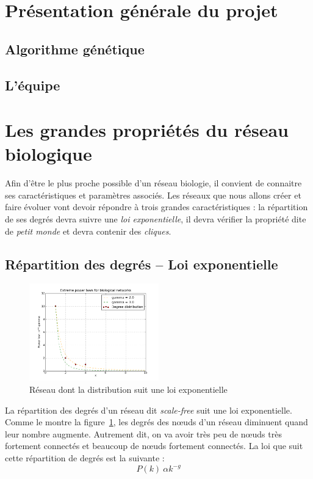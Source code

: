 


\maketitle


\section{Présentation générale du projet}

\subsection{Algorithme génétique}

\subsection{L'équipe}


\section{Les grandes propriétés du réseau biologique}
Afin d'être le plus proche possible d'un réseau biologie, il convient de connaitre ses caractéristiques et paramètres associés. Les réseaux que nous allons créer et faire évoluer vont devoir répondre à trois grandes caractéristiques : la répartition de ses degrés devra suivre une \textit{loi exponentielle}, il devra vérifier la propriété dite de \textit{\og petit monde \fg} et devra contenir des \textit{cliques}.

\subsection{Répartition des degrés -- Loi exponentielle}
\begin{figure}
  \vspace{-30pt}
  \begin{center}
    \includegraphics[width=0.50\textwidth]{plot.png}
  \end{center}
  \caption{Réseau dont la distribution suit une loi exponentielle}
  \label{scalefree}
\end{figure}
La répartition des degrés d'un réseau dit \textit{scale-free} suit une loi exponentielle. Comme le montre la figure~\ref{scalefree}, les degrés des nœuds d'un réseau diminuent quand leur nombre augmente. Autrement dit, on va avoir très peu de nœuds très fortement connectés et beaucoup de nœuds fortement connectés. La loi que suit cette répartition de degrés est la suivante :
$$ P(k) ~ \alpha k^{-g} $$

